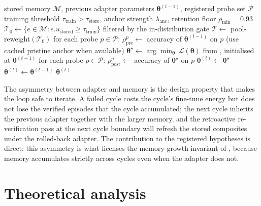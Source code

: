 \begin{algorithm}[!htbp]
\caption[Self-improvement loop with multi-modal retention guard (Stage~8c).]{Self-improvement loop with multi-modal retention guard (Stage~8c).}
\label{alg:sil}
\begin{algorithmic}[1]
\Require stored memory $\mathcal{M}$, previous adapter parameters $\boldsymbol{\theta}^{(t-1)}$, registered probe set $\mathcal{P}$
\Require training threshold $\tau_{\text{train}} > \tau_{\text{store}}$, anchor strength $\lambda_{\text{anc}}$, retention floor $\rho_{\min} = 0.93$
\State $\mathcal{T}_{0} \gets \{e \in \mathcal{M} : e.u_{\text{stored}} \ge \tau_{\text{train}}\}$ filtered by the in-distribution gate
\State $\mathcal{T} \gets$ pool-reweight$(\mathcal{T}_{0})$ 
\State for each probe $p\in\mathcal{P}$: $\rho_{\text{pre}}^{p} \gets$ accuracy of $\boldsymbol{\theta}^{(t-1)}$ on $p$ (use cached pristine anchor when available)
\State $\boldsymbol{\theta}^{\star} \gets \arg\min_{\boldsymbol{\theta}}\, \mathcal{L}(\boldsymbol{\theta})$ from , initialised at $\boldsymbol{\theta}^{(t-1)}$
\State for each probe $p\in\mathcal{P}$: $\rho_{\text{post}}^{p} \gets$ accuracy of $\boldsymbol{\theta}^{\star}$ on $p$
    \State $\boldsymbol{\theta}^{(t)} \gets \boldsymbol{\theta}^{\star}$ 
\Else
    \State $\boldsymbol{\theta}^{(t)} \gets \boldsymbol{\theta}^{(t-1)}$ 
\EndIf
\State \Return $\boldsymbol{\theta}^{(t)}$
\end{algorithmic}
\end{algorithm}

The asymmetry between adapter and memory is the design property that makes the loop safe to iterate. A failed cycle costs the cycle's fine-tune energy but does not lose the verified episodes that the cycle accumulated; the next cycle inherits the previous adapter together with the larger memory, and the retroactive re-verification pass at the next cycle boundary will refresh the stored composites under the rolled-back adapter. The contribution to the registered hypotheses is direct: this asymmetry is what licenses the memory-growth invariant of , because memory accumulates strictly across cycles even when the adapter does not.

\section{Theoretical analysis}
\label{sec:theory}


